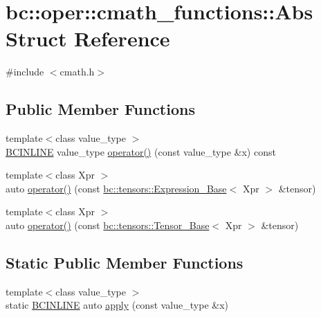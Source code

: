 \hypertarget{structbc_1_1oper_1_1cmath__functions_1_1Abs}{}\section{bc\+:\+:oper\+:\+:cmath\+\_\+functions\+:\+:Abs Struct Reference}
\label{structbc_1_1oper_1_1cmath__functions_1_1Abs}


{\ttfamily \#include $<$cmath.\+h$>$}

\subsection*{Public Member Functions}
\begin{DoxyCompactItemize}
\item 
{\footnotesize template$<$class value\+\_\+type $>$ }\\\hyperlink{common_8h_a6699e8b0449da5c0fafb878e59c1d4b1}{B\+C\+I\+N\+L\+I\+NE} value\+\_\+type \hyperlink{structbc_1_1oper_1_1cmath__functions_1_1Abs_a49b7bfa11dca0903af5c8c221a58e857}{operator()} (const value\+\_\+type \&x) const
\item 
{\footnotesize template$<$class Xpr $>$ }\\auto \hyperlink{structbc_1_1oper_1_1cmath__functions_1_1Abs_a8e80dd442d6f575cc5cfe314b80b807c}{operator()} (const \hyperlink{classbc_1_1tensors_1_1Expression__Base}{bc\+::tensors\+::\+Expression\+\_\+\+Base}$<$ Xpr $>$ \&tensor)
\item 
{\footnotesize template$<$class Xpr $>$ }\\auto \hyperlink{structbc_1_1oper_1_1cmath__functions_1_1Abs_a6f9be1d10e5348871dbb6702cf95ef0e}{operator()} (const \hyperlink{classbc_1_1tensors_1_1Tensor__Base}{bc\+::tensors\+::\+Tensor\+\_\+\+Base}$<$ Xpr $>$ \&tensor)
\end{DoxyCompactItemize}
\subsection*{Static Public Member Functions}
\begin{DoxyCompactItemize}
\item 
{\footnotesize template$<$class value\+\_\+type $>$ }\\static \hyperlink{common_8h_a6699e8b0449da5c0fafb878e59c1d4b1}{B\+C\+I\+N\+L\+I\+NE} auto \hyperlink{structbc_1_1oper_1_1cmath__functions_1_1Abs_a3470df75d49c41d6e766658d606d53b0}{apply} (const value\+\_\+type \&x)
\end{DoxyCompactItemize}


